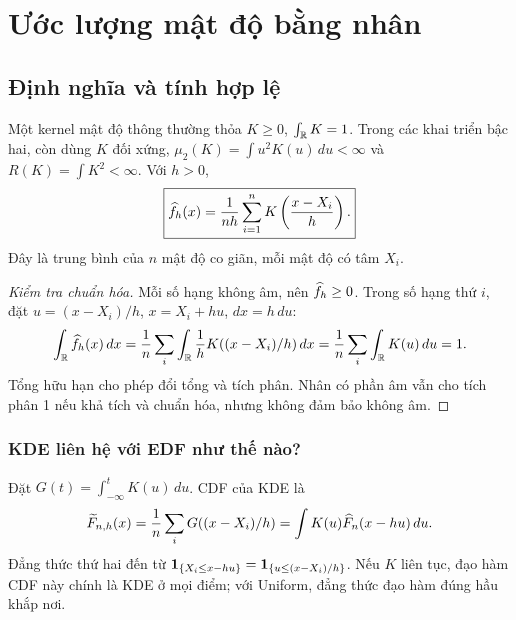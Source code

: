 \chapter{Ước lượng mật độ bằng nhân}\label{ch:kde}
\section{Định nghĩa và tính hợp lệ}
Một kernel mật độ thông thường thỏa $K\geq0$, $\int_{\mathbb R} K=1$.
Trong các khai triển bậc hai, còn dùng $K$ đối xứng,
$\mu_2(K)=\int u^2K(u)\,du<\infty$ và $R(K)=\int K^2<\infty$.
Với $h>0$,
\[
\boxed{\widehat f_h(x)=\frac1{nh}\sum_{i=1}^n
K\left(\frac{x-X_i}{h}\right).}
\]
Đây là trung bình của $n$ mật độ co giãn, mỗi mật độ có tâm $X_i$.
\begin{proof}[Kiểm tra chuẩn hóa]
Mỗi số hạng không âm, nên $\widehat f_h\geq0$. Trong số hạng thứ $i$,
đặt $u=(x-X_i)/h$, $x=X_i+hu$, $dx=h\,du$:
\[
\int_{\mathbb R}\widehat f_h(x)\,dx
=\frac1n\sum_i\int_{\mathbb R}\frac1hK((x-X_i)/h)\,dx
=\frac1n\sum_i\int_{\mathbb R} K(u)\,du=1.
\]
Tổng hữu hạn cho phép đổi tổng và tích phân. Nhân có phần âm vẫn cho
tích phân 1 nếu khả tích và chuẩn hóa, nhưng không đảm bảo không âm.
\end{proof}

\subsection{KDE liên hệ với EDF như thế nào?}
Đặt $G(t)=\int_{-\infty}^tK(u)\,du$. CDF của KDE là
\[
\widetilde F_{n,h}(x)=\frac1n\sum_iG((x-X_i)/h)
=\int K(u)\widehat F_n(x-hu)\,du.
\]
Đẳng thức thứ hai đến từ
$\mathbf 1_{\{X_i\leq x-hu\}}=\mathbf 1_{\{u\leq(x-X_i)/h\}}$.
Nếu $K$ liên tục, đạo hàm CDF này chính là KDE ở mọi điểm;
với Uniform, đẳng thức đạo hàm đúng hầu khắp nơi.

